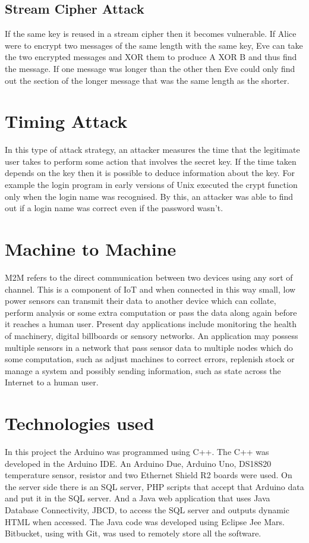 \subsection{Stream Cipher Attack}
If the same key is reused in a stream cipher then it becomes vulnerable. If Alice were to encrypt two messages of the same length with the same key, Eve can take the two encrypted messages and XOR them to produce A XOR B and thus find the message. If one message was longer than the other then Eve could only find out the section of the longer message that was the same length as the shorter.

\section{Timing Attack}
In this type of attack strategy, an attacker measures the time that the legitimate user takes to perform some action that involves the secret key. If the time taken depends on the key then it is possible to deduce information about the key. For example the login program in early versions of Unix executed the crypt function only when the login name was recognised. By this, an attacker was able to find out if a login name was correct even if the password wasn't.

\section{Machine to Machine}

M2M refers to the direct communication between two devices using any sort of channel. This is a component of IoT and when connected in this way small, low power sensors can transmit their data to another device which can collate, perform analysis or some extra computation or pass the data along again before it reaches a human user. Present day applications include monitoring the health of machinery, digital billboards or sensory networks. An application may possess multiple sensors in a network that pass sensor data to multiple nodes which do some computation, such as adjust machines to correct errors, replenish stock or manage a system and possibly sending information, such as state across the Internet to a human user.

\section{Technologies used}

In this project the Arduino was programmed using C++. The C++ was developed in the Arduino IDE. An Arduino Due, Arduino Uno, DS18S20 temperature sensor, resistor and two Ethernet Shield R2 boards were used. On the server side there is an SQL server, PHP scripts that accept that Arduino data and put it in the SQL server. And a Java web application that uses Java Database Connectivity, JBCD, to access the SQL server and outputs dynamic HTML when accessed. The Java code was developed using Eclipse Jee Mars. Bitbucket, using with Git, was used to remotely store all the software.


